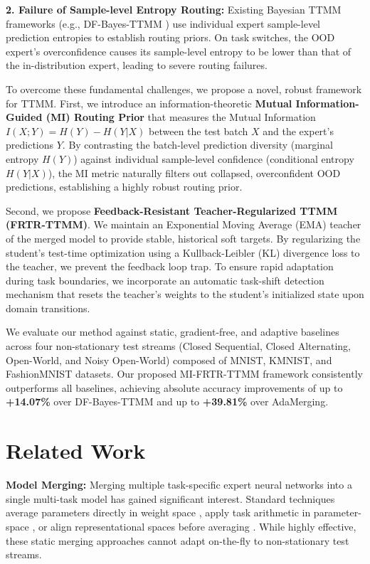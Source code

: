 \documentclass{article}
\theoremstyle{plain}
\theoremstyle{definition}
\theoremstyle{remark}
\begin{document}
\textbf{2. Failure of Sample-level Entropy Routing:} Existing Bayesian TTMM frameworks (e.g., DF-Bayes-TTMM \cite{anonymous2026dfbayes}) use individual expert sample-level prediction entropies to establish routing priors. On task switches, the OOD expert's overconfidence causes its sample-level entropy to be lower than that of the in-distribution expert, leading to severe routing failures.

To overcome these fundamental challenges, we propose a novel, robust framework for TTMM. First, we introduce an information-theoretic \textbf{Mutual Information-Guided (MI) Routing Prior} that measures the Mutual Information $I(X; Y) = H(Y) - H(Y|X)$ between the test batch $X$ and the expert's predictions $Y$. By contrasting the batch-level prediction diversity (marginal entropy $H(Y)$) against individual sample-level confidence (conditional entropy $H(Y|X)$), the MI metric naturally filters out collapsed, overconfident OOD predictions, establishing a highly robust routing prior.

Second, we propose \textbf{Feedback-Resistant Teacher-Regularized TTMM (FRTR-TTMM)}. We maintain an Exponential Moving Average (EMA) teacher of the merged model to provide stable, historical soft targets. By regularizing the student's test-time optimization using a Kullback-Leibler (KL) divergence loss to the teacher, we prevent the feedback loop trap. To ensure rapid adaptation during task boundaries, we incorporate an automatic task-shift detection mechanism that resets the teacher's weights to the student's initialized state upon domain transitions.

We evaluate our method against static, gradient-free, and adaptive baselines across four non-stationary test streams (Closed Sequential, Closed Alternating, Open-World, and Noisy Open-World) composed of MNIST, KMNIST, and FashionMNIST datasets. Our proposed MI-FRTR-TTMM framework consistently outperforms all baselines, achieving absolute accuracy improvements of up to \textbf{+14.07\%} over DF-Bayes-TTMM and up to \textbf{+39.81\%} over AdaMerging.

\section{Related Work}
\label{submission-related-work}

\textbf{Model Merging:} Merging multiple task-specific expert neural networks into a single multi-task model has gained significant interest. Standard techniques average parameters directly in weight space \cite{wortsman2022model}, apply task arithmetic in parameter-space \cite{ilharco2022editing}, or align representational spaces before averaging \cite{stoica2023zipit}. While highly effective, these static merging approaches cannot adapt on-the-fly to non-stationary test streams.
\end{document}
